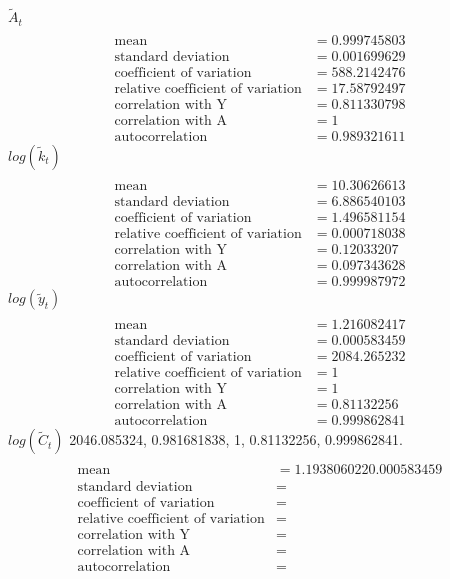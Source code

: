 \documentclass[letterpaper,12pt]{article}
\theoremstyle{definition}
\begin{document}
$\tilde{A}_t$
\begin{align*}
\\\text{mean} &= 0.999745803
\\\text{standard deviation} &= 	0.001699629
\\\text{coefficient of variation}&=588.2142476
\\\text{relative coefficient of variation}&=17.58792497
\\\text{correlation with Y}&=0.811330798
\\\text{correlation with A}&=1
\\\text{autocorrelation}&=0.989321611
\end{align*}
$log(\tilde{k}_t)$
\begin{align*}
\\\text{mean} &= 10.30626613
\\\text{standard deviation} &= 	6.886540103
\\\text{coefficient of variation}&=1.496581154
\\\text{relative coefficient of variation}&=0.000718038
\\\text{correlation with Y}&=0.12033207
\\\text{correlation with A}&=0.097343628
\\\text{autocorrelation}&=0.999987972
\end{align*}
$log(\tilde{y}_t)$
\begin{align*}
\\\text{mean} &= 1.216082417
\\\text{standard deviation} &= 	0.000583459
\\\text{coefficient of variation}&=2084.265232
\\\text{relative coefficient of variation}&=1
\\\text{correlation with Y}&=1
\\\text{correlation with A}&=0.81132256
\\\text{autocorrelation}&=0.999862841
\end{align*}
$log(\tilde{C}_t)$
	2046.085324,	0.981681838,	1,	0.81132256,	0.999862841.\\
\begin{align*}
\\\text{mean} &= 1.193806022	0.000583459
\\\text{standard deviation} &= 
\\\text{coefficient of variation}&=
\\\text{relative coefficient of variation}&=
\\\text{correlation with Y}&=
\\\text{correlation with A}&=
\\\text{autocorrelation}&=
\end{align*}
\end{document}
